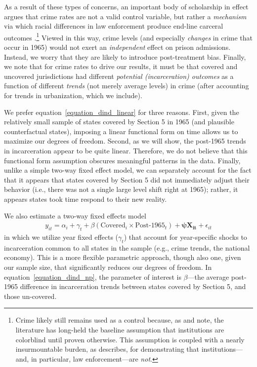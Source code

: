 \documentclass[12pt]{article}
\begin{document}
As a result of these types of concerns, an important body of scholarship in effect argues that crime rates are not a valid control variable, but rather a \emph{mechanism} via which racial differences in law enforcement produce end-line carceral outcomes \citep{Beckett:2006wf,Lynch:2014wi,VanCleve:2015ux}.\footnote{Crime likely still remains used as a control because, as \cite{Murakawa:2010tc} and \cite{Murakawa:2019wp} note, the literature has long-held the baseline assumption that institutions are colorblind until proven otherwise.  This assumption is coupled with a nearly insurmountable burden, as \cite{KohlerHausmann:tw} describes, for demonstrating that institutions---and, in particular, law enforcement---are \emph{not}.}  Viewed in this way, crime levels (and especially \emph{changes} in crime that occur in 1965) would not exert an \emph{independent} effect on prison admissions.  Instead, we worry that they are likely to introduce post-treatment bias.  Finally, we note that for crime rates to drive our results, it must be that covered and uncovered jurisdictions had different \emph{potential (incarceration) outcomes} as a function of different \emph{trends} (not merely average levels) in crime (after accounting for trends in urbanization, which we include).


We prefer equation~\ref{equation_dind_linear} for three reasons.  First, given the relatively small sample of states covered by Section 5 in 1965 (and plausible counterfactual states), imposing a linear functional form on time allows us to maximize our degrees of freedom.  Second, as we will show, the post-1965 trends in incarceration appear to be quite linear. Therefore, we do not believe that this functional form assumption obscures meaningful patterns in the data.  Finally, unlike a simple two-way fixed effect model, we can separately account for the fact that it appears that states covered by Section 5 did not immediately adjust their behavior (i.e., there was not a single large level shift right at 1965); rather, it appears states took time respond to their new reality.

We also estimate a two-way fixed effects model
\begin{align}
     y_{it} = \alpha_{i} + \gamma_{t} + \beta (\text{Covered}_{i} \times \text{Post-1965}_{t}) + \boldsymbol{\psi X_{it}} + \epsilon_{it}  \label{equation_dind_np}
\end{align}
in which we utilize year fixed effects ($\gamma_{t}$) that account for year-specific shocks to incarceration common to all states in the sample (e.g., crime trends, the national economy).  This is a more flexible parametric approach, though also one, given our sample size, that significantly reduces our degrees of freedom.  In equation~\ref{equation_dind_np}, the parameter of interest is $\beta$---the average post-1965 difference in incarceration trends between states covered by Section 5, and those un-covered.
\end{document}
